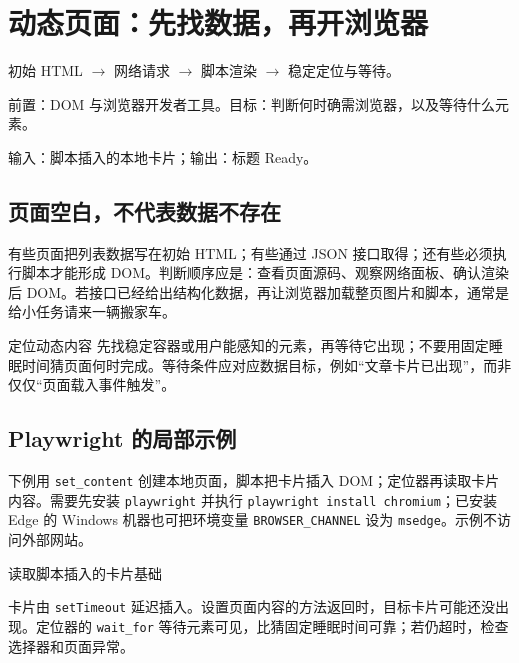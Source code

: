 \chapter{动态页面：先找数据，再开浏览器}\label{ch:browser}
\begin{tcolorbox}[title=章首知识地图,colframe=Ink]
初始 HTML $\longrightarrow$ 网络请求 $\longrightarrow$ 脚本渲染 $\longrightarrow$ 稳定定位与等待。
\end{tcolorbox}

\begin{tcolorbox}[title=学习目标与前置知识,colframe=Ink!65,colback=Ink!2]
前置：DOM 与浏览器开发者工具。目标：判断何时确需浏览器，以及等待什么元素。\par
输入：脚本插入的本地卡片；输出：标题 Ready。
\end{tcolorbox}

\section{页面空白，不代表数据不存在}
有些页面把列表数据写在初始 HTML；有些通过 JSON 接口取得；还有些必须执行脚本才能形成 DOM。判断顺序应是：查看页面源码、观察网络面板、确认渲染后 DOM。若接口已经给出结构化数据，再让浏览器加载整页图片和脚本，通常是给小任务请来一辆搬家车。

\begin{method}{定位动态内容}
先找稳定容器或用户能感知的元素，再等待它出现；不要用固定睡眠时间猜页面何时完成。等待条件应对应数据目标，例如“文章卡片已出现”，而非仅仅“页面载入事件触发”。
\end{method}

\section{Playwright 的局部示例}
下例用 \texttt{set\_content} 创建本地页面，脚本把卡片插入 DOM；定位器再读取卡片内容。需要先安装 \texttt{playwright} 并执行 \texttt{playwright install chromium}；已安装 Edge 的 Windows 机器也可把环境变量 \texttt{BROWSER\_CHANNEL} 设为 \texttt{msedge}。示例不访问外部网站。

\begin{example}{读取脚本插入的卡片}{基础}
\end{example}

卡片由 \texttt{setTimeout} 延迟插入。设置页面内容的方法返回时，目标卡片可能还没出现。定位器的 \texttt{wait\_for} 等待元素可见，比猜固定睡眠时间可靠；若仍超时，检查选择器和页面异常。

